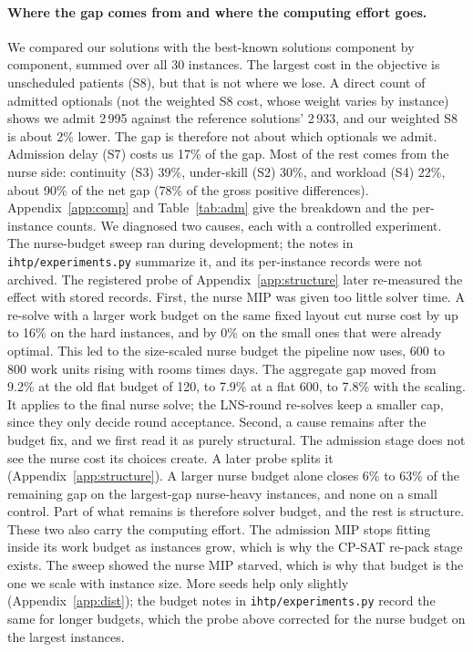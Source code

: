 \documentclass[11pt]{article}
\newcommand{\Sc}[1]{\textsf{S#1}}
\begin{document}
	\paragraph{Where the gap comes from and where the computing effort goes.}
	We compared our solutions with the best-known solutions component by component, summed over all 30
	instances. The largest cost in the objective is
	unscheduled patients (\Sc8), but that is not where we lose. A direct count of admitted optionals
	(not the weighted \Sc8 cost, whose weight varies by instance) shows we admit 2\,995 against the
	reference solutions' 2\,933, and our weighted \Sc8 is about 2\% lower. The gap is therefore not
	about which optionals we admit. Admission delay (\Sc7) costs us 17\% of the gap. Most of the
	rest comes from the nurse side: continuity (\Sc3) 39\%, under-skill (\Sc2) 30\%, and workload
	(\Sc4) 22\%, about 90\% of the net gap (78\% of the gross positive differences). Appendix~\ref{app:comp}
	and Table~\ref{tab:adm} give the breakdown and the per-instance counts. We diagnosed
	two causes, each with a controlled experiment. The nurse-budget sweep ran during development;
	the notes in \texttt{ihtp/experiments.py} summarize it, and its per-instance records were not
	archived. The registered probe of Appendix~\ref{app:structure} later re-measured the effect
	with stored records.
	First, the nurse MIP was given too little solver time. A re-solve with a larger work budget on
	the same fixed layout cut nurse cost by up to 16\% on the hard instances, and by 0\% on the small
	ones that were already optimal. This led to the size-scaled nurse budget the pipeline now uses, 600 to 800 work units rising with rooms times days. The aggregate gap moved from 9.2\% at the old flat budget of 120, to 7.9\% at a flat 600, to 7.8\% with the scaling. It applies to the final nurse solve; the LNS-round re-solves keep a smaller cap, since they only decide round acceptance. Second, a cause remains after the budget fix, and we first read it as purely structural. The admission stage does not see the nurse cost its choices create. A later probe splits it (Appendix~\ref{app:structure}). A larger nurse budget alone closes 6\% to 63\% of the remaining gap on the largest-gap nurse-heavy instances, and none on a small control. Part of what remains is therefore solver budget, and the rest is structure. These two also carry the computing effort. The admission MIP stops fitting inside its work budget as instances grow, which is why the CP-SAT re-pack stage exists. The sweep showed the nurse MIP starved, which is why that budget is the one we scale with instance size.
	More seeds help only slightly (Appendix~\ref{app:dist}); the budget notes in
	\texttt{ihtp/experiments.py} record the same for longer budgets, which the probe above
	corrected for the nurse budget on the largest instances.
\end{document}
